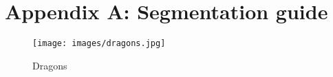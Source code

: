 \appendix

\chapter{Appendix A: Segmentation guide}\label{a:guide}
%
\begin{figure}[h]
	\centerline{
		\texttt{[image: images/dragons.jpg]}}
	\caption{Dragons}
\end{figure}



% 


% 

% 
